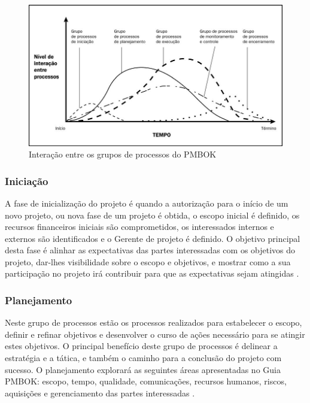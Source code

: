 \documentclass[
    12pt,               %
    openright,          %
    twoside,            %
    a4paper,            %
    chapter=TITLE,     %
    english,            %
    spanish,            %
    portuguese              %
    ]{abntex2}
\begin{document}
\begin{figure}[htb]
\RawFloats
	\caption{\label{fig:grupo_processos}Interação entre os grupos de processos do PMBOK}
	\begin{center}
	    \includegraphics[scale=0.50]{figuras/grupos_processos.jpg}
	\end{center}
\end{figure}

\subsubsection{Iniciação}
A fase de inicialização do projeto é quando a autorização para o início de um novo projeto, ou nova fase de um projeto é obtida, o escopo inicial é definido, os recursos financeiros iniciais são comprometidos, os interessados internos e externos são identificados e o Gerente de projeto é definido. O objetivo principal desta fase é alinhar as expectativas das partes interessadas com os objetivos do projeto, dar-lhes visibilidade sobre o escopo e objetivos, e mostrar como a sua participação no projeto irá contribuir para que as expectativas sejam atingidas \cite[p.~54]{pmi2013}.

\subsubsection{Planejamento}
Neste grupo de processos estão os processos realizados para estabelecer o escopo, definir e refinar objetivos e desenvolver o curso de ações necessário para se atingir estes objetivos. O principal benefício deste grupo de processos é delinear a estratégia e a tática, e também o caminho para a conclusão do projeto com sucesso. O planejamento explorará as seguintes áreas apresentadas no Guia PMBOK: escopo, tempo, qualidade, comunicações, recursos humanos, riscos, aquisições e gerenciamento das partes interessadas \cite[p.~55]{pmi2013}.
\end{document}
